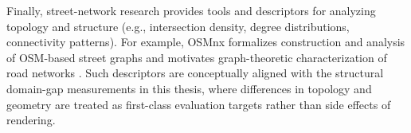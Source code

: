 Finally, street-network research provides tools and descriptors for analyzing topology and structure (e.g., intersection density, degree distributions, connectivity patterns). For example, OSMnx formalizes construction and analysis of OSM-based street graphs and motivates graph-theoretic characterization of road networks \cite{boeing2017osmnx}. Such descriptors are conceptually aligned with the structural domain-gap measurements in this thesis, where differences in topology and geometry are treated as first-class evaluation targets rather than side effects of rendering.
